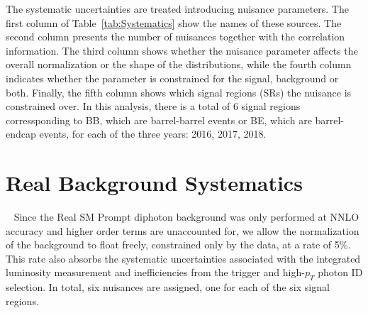 The systematic uncertainties are treated introducing nuisance parameters. The first column of Table~\ref{tab:Systematics} show the names of these sources. The second column presents the number of nuisances together with the correlation information. The third column shows whether the nuisance parameter affects the overall normalization or the shape of the distributions, while the fourth column indicates whether the parameter is constrained for the signal, background or both. Finally, the fifth column shows which signal regions (SRs) the nuisance is constrained over. In this analysis, there is a total of 6 signal regions corressponding to BB, which are barrel-barrel events or BE, which are barrel-endcap events, for each of the three years: 2016, 2017, 2018.







\section{Real Background Systematics}~\label{sec:realBKGSYS}
Since the Real SM Prompt diphoton background was only performed at NNLO accuracy and higher order terms are unaccounted for, we allow the normalization of the background to float freely, constrained only by the data, at a rate of 5\%. This rate also absorbs the systematic uncertainties associated with the integrated luminosity measurement and inefficiencies from the trigger and high-$p_T$ photon ID selection. In total, six nuisances are assigned, one for each of the six signal regions. 


